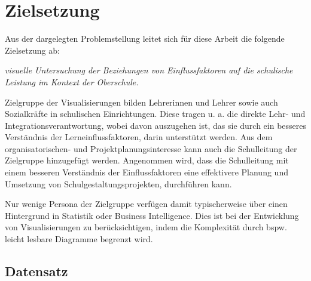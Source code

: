 \chapter[Zielsetzung]{Zielsetzung}

Aus der dargelegten Problemstellung leitet sich für diese Arbeit die folgende Zielsetzung ab:

\begin{center}
    \textit{visuelle Untersuchung der Beziehungen von Einflussfaktoren auf die schulische Leistung im Kontext der Oberschule.}
\end{center}    

Zielgruppe der Visualisierungen bilden Lehrerinnen und Lehrer sowie auch Sozialkräfte in schulischen Einrichtungen. 
Diese tragen u. a. die direkte Lehr- und Integrationsverantwortung, wobei davon auszugehen ist, das sie durch ein besseres Verständnis der Lerneinflussfaktoren, darin unterstützt werden.
Aus dem organisatorischen- und Projektplanungsinteresse kann auch die Schulleitung der Zielgruppe hinzugefügt werden.
Angenommen wird, dass die Schulleitung mit einem besseren Verständnis der Einflussfaktoren eine effektivere Planung und Umsetzung von Schulgestaltungsprojekten, durchführen kann.

Nur wenige Persona der Zielgruppe verfügen damit typischerweise über einen Hintergrund in Statistik oder Business Intelligence.
Dies ist bei der Entwicklung von Visualisierungen zu berücksichtigen, indem die Komplexität durch bspw. leicht lesbare Diagramme begrenzt wird.


\section[Untersuchter Datensatz]{Datensatz}

